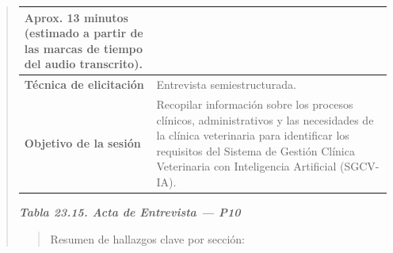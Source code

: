 \documentclass[
]{article}
\begin{document}
\begin{quote}
{\begin{longtable}[]{|
  >{\raggedright\arraybackslash}p{}|
  >{\raggedright\arraybackslash}p{}|}
\begin{minipage}[t]{\linewidth}
Aprox. 13 minutos (estimado a partir de las marcas de tiempo del audio transcrito).
\end{minipage} \\
\hline
\textbf{Técnica de elicitación} & \begin{minipage}[t]{\linewidth}\raggedright
Entrevista semiestructurada.
\end{minipage} \\
\hline
\textbf{Objetivo de la sesión} & \begin{minipage}[t]{\linewidth}\raggedright
Recopilar información sobre los procesos clínicos, administrativos y las necesidades de la clínica veterinaria para identificar los requisitos del Sistema de Gestión Clínica Veterinaria con Inteligencia Artificial (SGCV-IA).
\end{minipage} \\
\hline
\end{longtable}
}

\protect{}\label{_bookmark_P10_acta}{}\emph{\textbf{Tabla 23.15. Acta de Entrevista --- P10}}

\begin{quote}
Resumen de hallazgos clave por sección:
\end{quote}


\end{quote}
\end{document}
